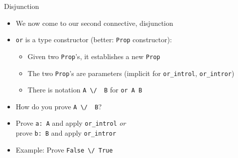 \begin{frame}[fragile]{Disjunction}
\begin{itemize}
  \item We now come to our second connective, disjunction


  \pause

  \item \lstinline|or| is a type constructor (better: \lstinline|Prop| constructor):
    \begin{itemize}
      \item Given two \lstinline|Prop|'s, it establishes a new \lstinline|Prop|
      \item The two \lstinline|Prop|'s are parameters (implicit for \lstinline|or_introl|, \lstinline|or_intror|)
      \item There is notation \lstinline|A \/  B| for \lstinline|or A B|
    \end{itemize}

  \pause

  \item How do you prove \lstinline|A \/  B|?

  \pause

  \item Prove \lstinline|a: A| and apply \lstinline|or_introl| \textit{or}\\
  prove \lstinline|b: B| and apply \lstinline|or_intror|

  \pause

  \item Example: Prove \lstinline|False \/ True|

\end{itemize}
\end{frame}

